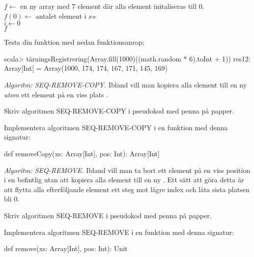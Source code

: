 \begin{algorithm}[H]

 $f \leftarrow$ en ny array med $7$ element där alla element initaliseras till 0.\\
 $f(0) \leftarrow$ antalet element i $xs$ \\
 $i \leftarrow 0$  \\
 \Return $f$
\end{algorithm}

Testa din funktion med nedan funktionsanrop:
\begin{REPL}
scala> tärningsRegistrering(Array.fill(1000)((math.random * 6).toInt + 1))
res12: Array[Int] = Array(1000, 174, 174, 167, 171, 145, 169)
\end{REPL}

\Task \emph{Algoritm: SEQ-REMOVE-COPY.} Ibland vill man kopiera alla element till en ny  \emph{utom} ett element på en viss plats .

\Subtask\Pen Skriv algoritmen SEQ-REMOVE-COPY i pseudokod med penna på papper.

\Subtask Implementera algoritmen SEQ-REMOVE-COPY i en funktion med denna signatur:
\begin{Code}
def removeCopy(xs: Array[Int], pos: Int): Array[Int]
\end{Code}

\Task \emph{Algoritm: SEQ-REMOVE.} Ibland vill man ta bort ett element på en viss position i en befintlig  utan att kopiera alla element till en ny . Ett sätt att göra detta är att flytta alla efterföljande element ett steg mot lägre index och låta sista platsen bli 0.

\Subtask\Pen Skriv algoritmen SEQ-REMOVE i pseudokod med penna på papper.

\Subtask Implementera algoritmen SEQ-REMOVE i en funktion med denna signatur:
\begin{Code}
def remove(xs: Array[Int], pos: Int): Unit
\end{Code}




